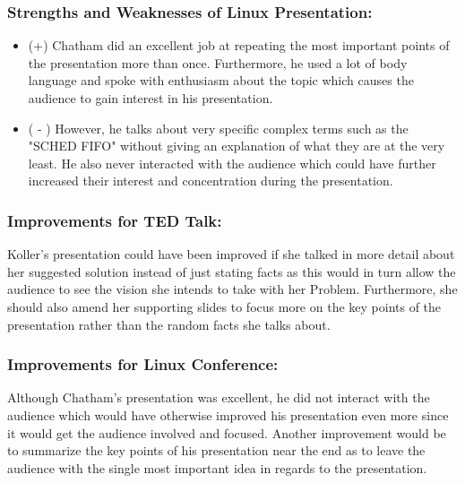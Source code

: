 \documentclass[12pt]{article}
\begin{document}
\subsubsection*{Strengths and Weaknesses of Linux Presentation:}

\begin{itemize}
\item (+) Chatham did an excellent job at repeating the most important points of the presentation more than once. Furthermore, he used a lot of body language and spoke with enthusiasm about the topic which causes the audience to gain interest in his presentation.
\item ( - ) However, he talks about very specific complex terms such as the "SCHED FIFO" without giving an explanation of what they are at the very least. He also never interacted with the audience which could have further increased their interest and concentration during the presentation.
\end{itemize}

\subsubsection*{Improvements for TED Talk:}
    Koller's presentation could have been improved if she talked in more detail about her suggested solution instead of just stating facts as this would in turn allow the audience to see the vision she intends to take with her Problem. Furthermore, she should also amend her supporting slides to focus more on the key points of the presentation rather than the random facts she talks about.

\subsubsection*{Improvements for Linux Conference:}
    Although Chatham's presentation was excellent, he did not interact with the audience which would have otherwise improved his presentation even more since it would get the audience involved and focused. Another improvement would be to summarize the key points of his presentation near the end as to leave the audience with the single most important idea in regards to the presentation.
\end{document}

